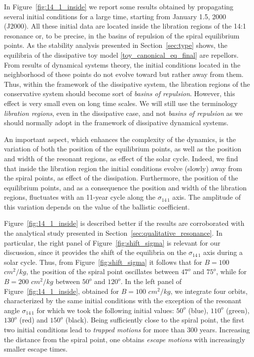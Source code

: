 \documentclass[12pt,reqno]{amsart}
\numberwithin{equation}{section}
\begin{document}
In Figure~\ref{fig:14_1_inside} we report some results obtained by propagating several initial conditions for a large time, starting from January 1.5, 2000 (J2000). All these initial data are located inside the libration regions of the 14:1
resonance or, to be precise, in the  basins of repulsion of the spiral equilibrium points. As the stability analysis presented in Section~\ref{sec:type} shows,  the equilibria of the dissipative toy model \eqref{toy_canonical_eq_final} are repellors.
From results of dynamical systems theory, the initial conditions located in the neighborhood
of these points do not evolve toward but rather away from them. Thus, within the framework of the dissipative system, the
libration regions of the conservative system should become sort of {\it basins of repulsion}. However, this effect is very small  even on long time scales. We will still use the terminology {\it libration regions}, even in the dissipative case, and not {\it basins of repulsion} as we should normally adopt in the framework of dissipative dynamical systems.

An important aspect, which enhances the complexity of the dynamics, is the variation of both the position of
the equilibrium points, as well as the position and width of the resonant regions, as effect of the solar cycle.
Indeed, we find that inside the libration region the initial conditions evolve (slowly) away from the spiral points,
as effect of the dissipation. Furthermore, the position of the equilibrium points, and as a consequence the position
and width of the libration regions, fluctuates with an 11-year cycle along the $\sigma_{1\!4 \,  1}$ axis. The amplitude of this variation depends on the value of the ballistic coefficient.

Figure~\ref{fig:14_1_inside} is described better if the results are corroborated with the analytical study presented in
Section~\ref{sec:qualitative_resonance}. In particular, the right panel of Figure~\ref{fig:shift_sigma} is relevant for our discussion, since it provides the shift of the equilibria on the $\sigma_{1\!4 \,  1}$ axis during a solar cycle. Thus, from Figure~\ref{fig:shift_sigma} it follows that for $B=100$ $cm^2/kg$, the position of the
spiral point oscillates between $47^o$ and $75^o$, while for $B=200$ $cm^2/kg$ between $50^o$ and $120^o$. In the left panel of Figure~\ref{fig:14_1_inside}, obtained for $B=100$ $cm^2/kg$, we integrate four orbits, characterized by the same initial conditions with the exception of the resonant angle $\sigma_{1\!4 \,  1}$ for which we took the following initial values: $50^o$ (blue), $110^o$ (green), $130^o$ (red) and $150^o$ (black). Being sufficiently close to the
spiral point, the first two initial conditions lead to {\it trapped motions} for more than $300$ years. Increasing the distance from the
spiral point, one obtains {\it escape motions} with increasingly smaller escape times.
\end{document}
